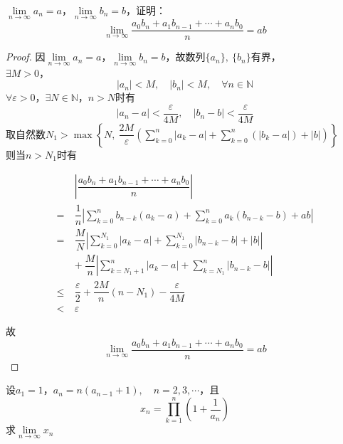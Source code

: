 \begin{proposition}

    $\lim\limits_{n\to\infty}{a_n} = a $，$\lim\limits_{n\to\infty}{b_n} = b $，证明：
    $$\lim_{n\to\infty}{\dfrac{a_0b_n + a_1b_{n-1} + \cdots + a_nb_0}{n}} = ab$$

\end{proposition}

\begin{proof}

    因$\lim\limits_{n\to\infty}{a_n} = a$，$\lim\limits_{n\to\infty}{b_n} = b $，故数列$\{a_n\},\ \{b_n\}$有界，\\
    $\exists M > 0$，
    $$|a_n| < M,\quad |b_n| < M, \quad \forall n \in \mathbb{N}$$
    $\forall \varepsilon > 0 $，$\exists N \in \mathbb{N}$，$n > N$时有
    $$|a_n -a| < \dfrac{\varepsilon}{4M}, \quad |b_n -b| < \dfrac{\varepsilon}{4M}$$
    取自然数$N_1 > \max\left\{N,\ \dfrac{2M}{\varepsilon}\left( \sum\limits_{k=0}^{n}{|a_k - a|} + \sum\limits_{k=0}^{n}{(|b_k - a|)} + |b| \right)\right\}$\\
    则当$n > N_1$时有

    \begin{align*}
        &\left| \dfrac{a_0b_n + a_1b_{n-1} + \cdots + a_nb_0}{n} \right| \\
        = \ & \dfrac{1}{n} \left| \sum_{k=0}^{n}{b_{n-k}(a_k - a)} + \sum_{k=0}^{n}{a_k(b_{n-k} - b)} + ab \right| \\
        = \ & \dfrac{M}{N} \left| \sum_{k=0}^{N_1}{|a_k - a|} + \sum_{k=0}^{N_1}{|b_{n-k} - b|} + |b| \right| \\
        \ & + \ \dfrac{M}{n} \left| \sum_{k=N_1+1}^{n}{|a_k - a|} + \sum_{k=N_1}^{n}{|b_{n-k} - b|} \right| \\
        \leq \ & \dfrac{\varepsilon}{2} + \dfrac{2M}{n}(n - N_1) - \dfrac{\varepsilon}{4M} \\
        < \ & \varepsilon 
    \end{align*}

    故
    $$\lim_{n\to\infty}{\dfrac{a_0b_n + a_1b_{n-1} + \cdots + a_nb_0}{n}} = ab$$
    
\end{proof}

\begin{proposition}

    设$a_1 = 1$，$a_n = n(a_{n-1}+1),\quad n = 2,3,\cdots $，且
    $$x_n = \prod_{k=1}^{n}{(1+\dfrac{1}{a_n})}$$
    求$\lim\limits_{n\to\infty}{x_n}$

\end{proposition}

